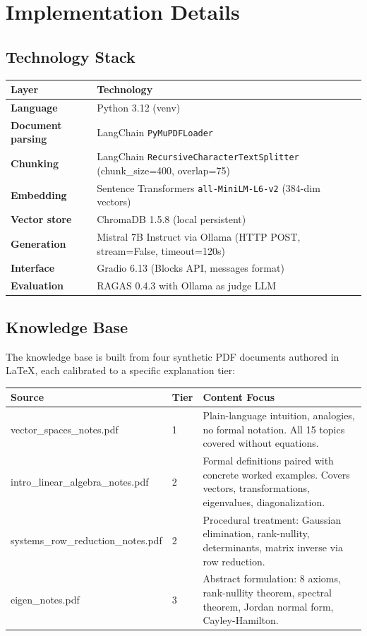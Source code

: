 \documentclass[11pt]{article}
\begin{document}
\section{Implementation Details}

\subsection{Technology Stack}

\begin{tabular}{>{\bfseries}p{4cm} p{9cm}}
\toprule
Layer & Technology \\
\midrule
Language & Python 3.12 (venv) \\
Document parsing & LangChain \texttt{PyMuPDFLoader} \\
Chunking & LangChain \texttt{RecursiveCharacterTextSplitter} (chunk\_size=400, overlap=75) \\
Embedding & Sentence Transformers \texttt{all-MiniLM-L6-v2} (384-dim vectors) \\
Vector store & ChromaDB 1.5.8 (local persistent) \\
Generation & Mistral 7B Instruct via Ollama (HTTP POST, stream=False, timeout=120s) \\
Interface & Gradio 6.13 (Blocks API, messages format) \\
Evaluation & RAGAS 0.4.3 with Ollama as judge LLM \\
\bottomrule
\end{tabular}

\subsection{Knowledge Base}

The knowledge base is built from four synthetic PDF documents authored in \LaTeX{}, each calibrated to a specific explanation tier:

\begin{tabular}{>{\ttfamily}p{5.2cm} p{1.2cm} p{6.5cm}}
\toprule
\normalfont\bfseries Source & Tier & Content Focus \\
\midrule
vector\_spaces\_notes.pdf & 1 & Plain-language intuition, analogies, no formal notation. All 15 topics covered without equations. \\
intro\_linear\_algebra\_notes.pdf & 2 & Formal definitions paired with concrete worked examples. Covers vectors, transformations, eigenvalues, diagonalization. \\
systems\_row\_reduction\_notes.pdf & 2 & Procedural treatment: Gaussian elimination, rank-nullity, determinants, matrix inverse via row reduction. \\
eigen\_notes.pdf & 3 & Abstract formulation: 8 axioms, rank-nullity theorem, spectral theorem, Jordan normal form, Cayley-Hamilton. \\
\bottomrule
\end{tabular}
\end{document}
